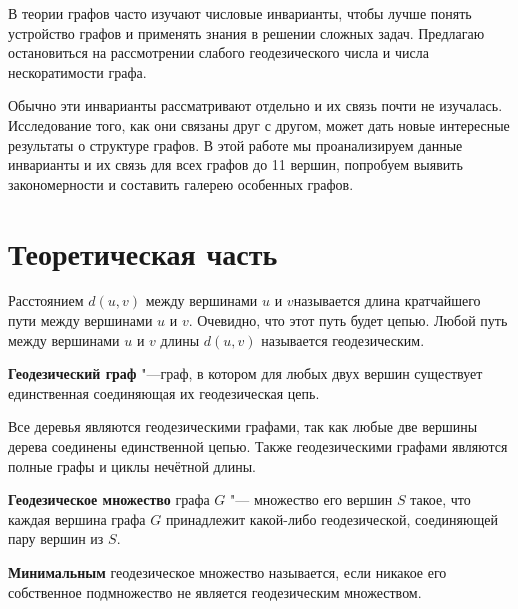 \documentclass[bachelor, och, nir]{SCWorks}
\begin{document}




\tableofcontents

\intro
В теории графов часто изучают числовые инварианты, чтобы лучше понять устройство графов и применять знания в решении сложных задач. Предлагаю остановиться на рассмотрении слабого геодезического числа и числа нескоратимости графа.

Обычно эти инварианты рассматривают отдельно и их связь почти не изучалась. Исследование того, как они связаны друг с другом, может дать новые интересные результаты о структуре графов. В этой работе мы проанализируем данные инварианты и их связь для всех графов до 11 вершин, попробуем выявить закономерности и составить галерею особенных графов.

\section{Теоретическая часть}

Расстоянием $d(u, v)$ между вершинами $u$ и $v$называется длина
кратчайшего пути между вершинами $u$ и $v$. Очевидно, что этот путь будет
цепью. Любой путь между вершинами $u$ и $v$ длины $d(u, v)$ называется 
геодезическим. 

\textbf{Геодезический граф} "---граф, в котором для любых двух вершин существует единственная
соединяющая их геодезическая цепь.

Все деревья являются геодезическими графами, так как любые
две вершины дерева соединены единственной цепью. Также геодезическими
графами являются полные графы и циклы нечётной длины. 

\textbf{Геодезическое множество} графа $G$ "--- множество его
вершин $S$ такое, что каждая вершина графа $G$ принадлежит какой-либо
геодезической, соединяющей пару вершин из $S$. 

\textbf{Минимальным} геодезическое множество называется, если никакое его 
собственное подмножество не является геодезическим множеством. 
\end{document}
